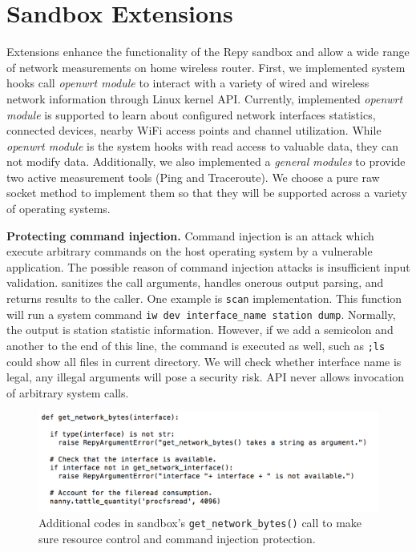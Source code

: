 \section{Sandbox Extensions}
\label{sec.extensions}
Extensions enhance the functionality of the Repy sandbox and allow a wide range of network measurements on home wireless router. First, we implemented system hooks call \textit{openwrt module} to interact with a variety of wired and wireless network information through Linux kernel API. Currently, implemented \textit{openwrt module} is supported to learn about configured network interfaces statistics, connected devices, nearby WiFi access points and channel utilization. While \textit{openwrt module} is the system hooks with read access to valuable data, they can not modify data. Additionally, we also implemented a \textit{general modules} to provide two active measurement tools (Ping and Traceroute). We choose a pure raw socket method to implement them so that they will be supported across a variety of operating systems. 

\textbf{Protecting command injection.} Command injection is an attack which execute arbitrary commands on the host operating system by a vulnerable application. The possible reason of command injection attacks is insufficient input validation. \sysname sanitizes the call arguments, handles onerous output parsing, and returns results to the caller. One example is \texttt{scan} implementation. This function will run a system command \texttt{iw dev interface\_name station dump}. Normally, the output is station statistic information. However, if we add a semicolon and another to the end of this line, the command is executed as well, such as \texttt{;ls} could show all files in current directory. We will check whether interface name is legal, any illegal arguments will pose a security risk. \sysname API never allows invocation of arbitrary system calls.

\begin{figure}%
\centering
\includegraphics[width=0.8\columnwidth]{figure/nanny.png}
\caption{Additional codes in \sysname sandbox's \texttt{get\_network\_bytes()} call to make sure resource control and command injection protection.}
\label{fig-nanny}
\end{figure}

